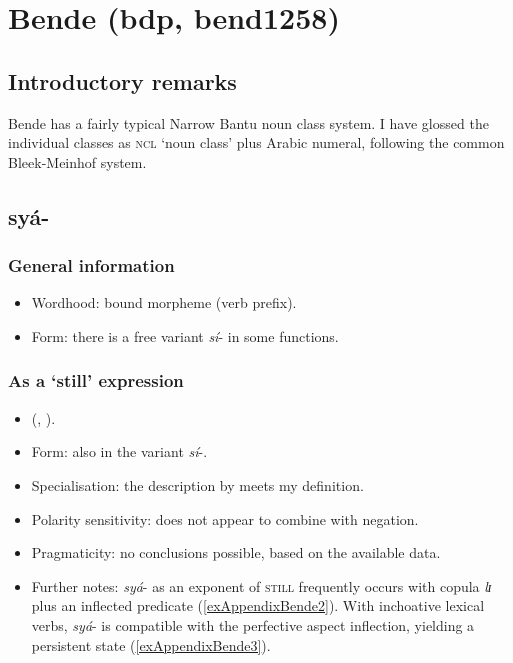\section{Bende (bdp, bend1258)}
\label{appendixBende}
\subsection{Introductory remarks}
Bende has a fairly typical Narrow Bantu noun class system. I have glossed the individual classes as \textsc{ncl} \lq noun class' plus Arabic numeral, following the common Bleek-Meinhof system.

\subsection{syá-}
\subsubsection{General information}
\begin{itemize}
	\item Wordhood: bound morpheme (verb prefix).	
	\item Form: there is a free variant \mbox{\textit{sí}-} in some functions.
\end{itemize}


\subsubsection{As a  \lq still\rq{ }expression}
\begin{itemize}
	\item  \citeauthor{Abe2015} (\citeyear{Abe2015}, \citeyear{Abe2016}).
	\item Form: also in the variant \textit{sí}-.
	\item Specialisation: the description by \citeauthor{Abe2015} meets my definition.
	\item Polarity sensitivity: does not appear to combine with negation.
	\item Pragmaticity: no conclusions possible, based on the available data.
	\item Further notes: \textit{syá}- as an exponent of \textsc{still} frequently occurs with copula \textit{lɪ} plus an inflected predicate (\ref{exAppendixBende2}). With inchoative lexical verbs, \textit{syá}- is compatible with the perfective aspect inflection, yielding a persistent state (\ref{exAppendixBende3}).
\end{itemize}

